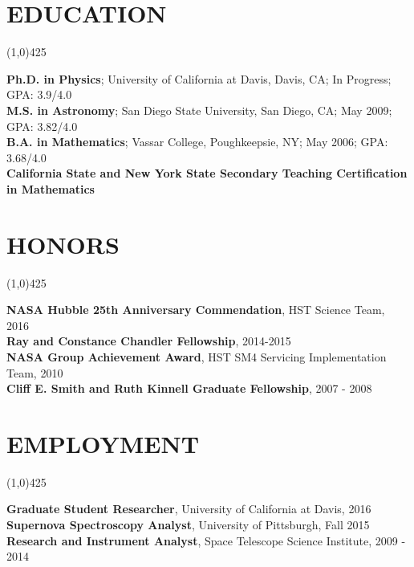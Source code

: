 \documentclass{res}
\begin{document}
\begin{resume}
\section{EDUCATION}
\vspace{-.2in} 
\begin{center}
\line(1,0){425}
\end{center}
\vspace{-.3in} 
\vspace{0.1in} 
   {\bf Ph.D. in Physics}; University of California at Davis, Davis, CA; In Progress; GPA: 3.9/4.0 \\
   {\bf M.S. in Astronomy}; San Diego State University, San Diego, CA; May 2009; GPA: 3.82/4.0 \\
   {\bf B.A. in Mathematics}; Vassar College, Poughkeepsie, NY; May 2006; GPA: 3.68/4.0 \\   
   {\bf California State and New York State Secondary Teaching Certification in Mathematics} 
\section{HONORS}
\vspace{-.2in} 
\begin{center}
\line(1,0){425}
\end{center}
\vspace{-.3in} 
\vspace{0.1in} 
{\bf NASA Hubble 25th Anniversary Commendation}, HST Science Team, 2016 \\ %
{\bf Ray and Constance Chandler Fellowship}, 2014-2015 \\
{\bf NASA Group Achievement Award}, HST SM4 Servicing Implementation Team, 2010 \\
{\bf Cliff E. Smith and Ruth Kinnell Graduate Fellowship}, 2007 - 2008 
\section{EMPLOYMENT}
\vspace{-.2in} 
\begin{center}
\line(1,0){425}
\end{center}
\vspace{-.3in} 
\vspace{0.1in} 
    {\bf Graduate Student Researcher}, University of California at Davis, 2016 \\
    {\bf Supernova Spectroscopy Analyst}, University of Pittsburgh, Fall 2015 \\
    {\bf Research and Instrument Analyst}, Space Telescope Science Institute, 2009 - 2014 
%    

\end{resume}
\end{document}
